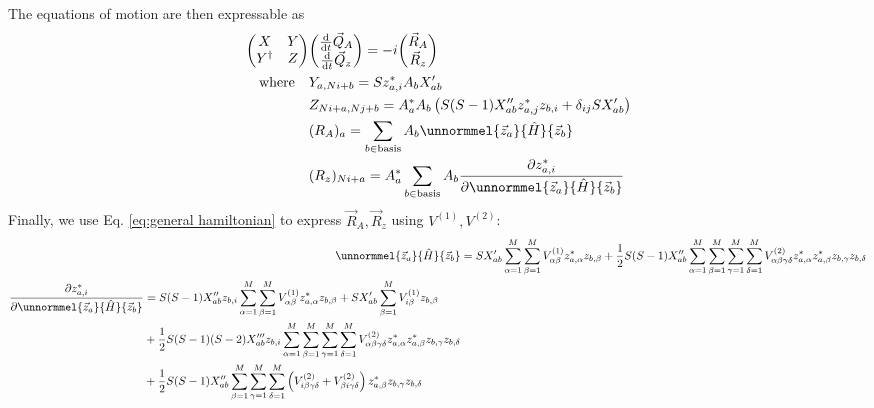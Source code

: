 \documentclass[12pt]{article}
\begin{document}
	The equations of motion are then expressable as
	\begin{equation}\label{eq:variational eqns of motion}
	\begin{split}
	\mqty(X & Y\\Y^\dagger & Z)&\mqty(\dv{t}\vec{Q}_A\\\dv{t}\vec{Q}_z)=-i\mqty(\vec{R}_A\\\vec{R}_z)\\
	\qq{where}&Y_{a,Ni+b}=Sz^*_{a,i}A_b X'_{ab}\\
	&Z_{Ni+a,Nj+b}=A^*_a A_b \left(S(S-1)X_{ab}''z_{a,j}^* z_{b,i}+\delta_{ij}SX_{ab}'\right)\\
	&(R_A)_a=\sum_{b\in\text{basis}}A_b\unnormmel{\vec{z}_a}{\hat{H}}{\vec{z}_b}\\
	&(R_z)_{Ni+a}=A_a^*\sum_{b\in\text{basis}}A_b\pdv{z_{a,i}^*}\unnormmel{\vec{z}_a}{\hat{H}}{\vec{z}_b}
	\end{split}
	\end{equation}
	Finally, we use Eq. \ref{eq:general hamiltonian} to express $\vec{R}_A,\vec{R}_z$ using $V^{(1)},V^{(2)}$:
	\begin{align}
	\unnormmel{\vec{z}_a}{\hat{H}}{\vec{z}_b}&=SX_{ab}'\sum_{\alpha=1}^M\sum_{\beta=1}^MV^{(1)}_{\alpha\beta}z^*_{a,\alpha}z_{b,\beta}+\frac{1}{2}S(S-1)X_{ab}''\sum_{\alpha=1}^M\sum_{\beta=1}^M\sum_{\gamma=1}^M\sum_{\delta=1}^M V^{(2)}_{\alpha\beta\gamma\delta}z^*_{a,\alpha}z^*_{a,\beta}z_{b,\gamma}z_{b,\delta}\notag\\
	\begin{split}
	\pdv{z_{a,i}^*}\unnormmel{\vec{z}_a}{\hat{H}}{\vec{z}_b}&=S(S-1)X_{ab}''z_{b,i}\sum_{\alpha=1}^M\sum_{\beta=1}^M V^{(1)}_{\alpha\beta}z^*_{a,\alpha}z_{b,\beta}+SX_{ab}'\sum_{\beta=1}^M V^{(1)}_{i\beta}z_{b,\beta}\\
	&+\frac{1}{2}S(S-1)(S-2)X_{ab}'''z_{b,i}\sum_{\alpha=1}^M\sum_{\beta=1}^M\sum_{\gamma=1}^M\sum_{\delta=1}^M V^{(2)}_{\alpha\beta\gamma\delta}z^*_{a,\alpha}z^*_{a,\beta}z_{b,\gamma}z_{b,\delta}\\
	&+\frac{1}{2}S(S-1)X_{ab}''\sum_{\beta=1}^M\sum_{\gamma=1}^M\sum_{\delta=1}^M \left(V^{(2)}_{i\beta\gamma\delta}+V^{(2)}_{\beta i\gamma\delta}\right)z^*_{a,\beta}z_{b,\gamma}z_{b,\delta}
	\end{split}
	\end{align}
	
\end{document}

